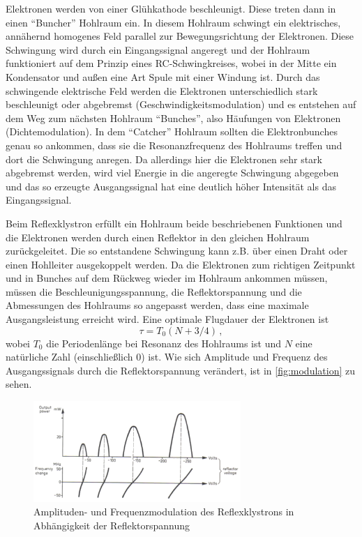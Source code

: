 Elektronen werden von einer Glühkathode beschleunigt. 
Diese treten dann in einen \enquote{Buncher} Hohlraum ein.
In diesem Hohlraum schwingt ein elektrisches, annähernd homogenes Feld parallel zur Bewegungsrichtung der Elektronen.
Diese Schwingung wird durch ein Eingangssignal angeregt und der Hohlraum funktioniert auf dem Prinzip eines RC-Schwingkreises,
wobei in der Mitte ein Kondensator und außen eine Art Spule mit einer Windung ist.
Durch das schwingende elektrische Feld werden die Elektronen unterschiedlich stark beschleunigt oder abgebremst (Geschwindigkeitsmodulation)
und es entstehen auf dem Weg zum nächsten Hohlraum \enquote{Bunches}, also Häufungen von Elektronen (Dichtemodulation).
In dem \enquote{Catcher} Hohlraum sollten die Elektronbunches genau so ankommen, dass sie die Resonanzfrequenz des Hohlraums treffen und dort die Schwingung anregen.
Da allerdings hier die Elektronen sehr stark abgebremst werden, wird viel Energie in die angeregte Schwingung abgegeben 
und das so erzeugte Ausgangssignal hat eine deutlich höher Intensität als das Eingangssignal.

Beim Reflexklystron erfüllt ein Hohlraum beide beschriebenen Funktionen und die Elektronen werden durch einen Reflektor in den gleichen Hohlraum zurückgeleitet.
Die so entstandene Schwingung kann z.B. über einen Draht oder einen Hohlleiter ausgekoppelt werden.
Da die Elektronen zum richtigen Zeitpunkt und in Bunches auf dem Rückweg wieder im Hohlraum ankommen müssen, 
müssen die Beschleunigungsspannung, die Reflektorspannung und die Abmessungen des Hohlraums
so angepasst werden, dass eine maximale Ausgangsleistung erreicht wird.
Eine optimale Flugdauer der Elektronen ist 
\begin{equation}
    \tau = T_0 (N+3/4) \, ,
\end{equation}
wobei $T_0$ die Periodenlänge bei Resonanz des Hohlraums ist und $N$ eine natürliche Zahl (einschließlich 0) ist.
Wie sich Amplitude und Frequenz des Ausgangssignals durch die Reflektorspannung verändert, ist in \autoref{fig:modulation} zu sehen.

\begin{figure}
    \centering
    \includegraphics[width=0.7\textwidth]{images/modulation_white.png}
    \caption{Amplituden- und Frequenzmodulation des Reflexklystrons in Abhängigkeit der Reflektorspannung \cite{V53_old}}
    \label{fig:modulation}
\end{figure}

